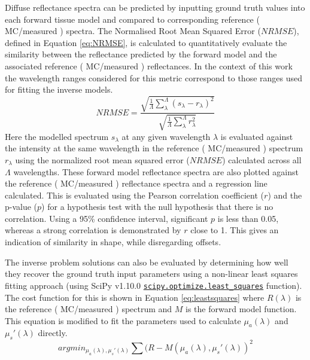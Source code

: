 Diffuse reflectance spectra can be predicted by inputting ground truth values into each forward tissue model and compared to corresponding reference (%
MC/measured%
) spectra. The Normalised Root Mean Squared Error ($NRMSE$), defined in Equation \eqref{eq:NRMSE}, is calculated to quantitatively evaluate the similarity between the reflectance predicted by the forward model and the associated reference (
MC/measured%
) reflectances. In the context of this work the wavelength ranges considered for this metric correspond to those ranges used for fitting the inverse models.
\begin{equation}
    NRMSE = \frac{\sqrt{\frac{1}{\Lambda}\sum_{\lambda}^{\Lambda}\left(s_{\lambda} - r_{\lambda}\right)^2}}{\sqrt{\frac{1}{\Lambda}\sum_{\lambda}^{\Lambda} r^2_{\lambda}}}
    \label{eq:NRMSE}
\end{equation}
Here the modelled spectrum $s_{\lambda}$ at any given wavelength $\lambda$ is evaluated against the intensity at the same wavelength in the reference (
MC/measured
) spectrum $r_{\lambda}$ using the normalized root mean squared error ($NRMSE$) calculated across all $\Lambda$ wavelengths. These forward model reflectance spectra are also plotted against the reference (
MC/measured
) reflectance spectra and a regression line calculated. This is evaluated using the Pearson correlation coefficient ($r$) and the p-value ($p$) for a hypothesis test with the null hypothesis that there is no correlation. Using a 95\% confidence interval, significant $p$ is less than 0.05, whereas a strong correlation is demonstrated by $r$ close to 1.  This gives an indication of similarity in shape, while disregarding offsets.

The inverse problem solutions can also be evaluated by determining how well they recover the ground truth input parameters using a non-linear least squares fitting approach (using SciPy v1.10.0 \href{https://docs.scipy.org/doc/scipy/reference/generated/scipy.optimize.least_squares.html}{\texttt{scipy.optimize.least\_squares}} function). The cost function for this is shown in Equation \eqref{eq:leastsquares} where $R(\lambda)$ is the reference (
MC/measured
) spectrum and $M$ is the forward model function. This equation is modified to fit the parameters used to calculate $\mu_a(\lambda)$ and $\mu_s'(\lambda)$ directly.
\begin{equation}
    argmin_{\mu_{a}(\lambda), \mu_{s}'(\lambda)} \sum (R - M(\mu_{a}(\lambda), \mu_s'(\lambda))^2
    \label{eq:leastsquares}
\end{equation}

